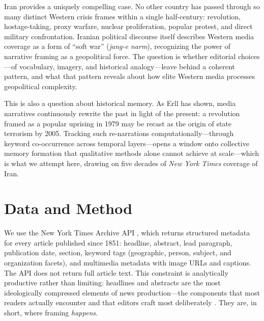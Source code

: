 \documentclass{dhnbpub}
\begin{document}
Iran provides a uniquely compelling case. No other country has passed through so many distinct Western crisis frames within a single half-century: revolution, hostage-taking, proxy warfare, nuclear proliferation, popular protest, and direct military confrontation. Iranian political discourse itself describes Western media coverage as a form of ``soft war'' (\emph{jang-e narm}), recognizing the power of narrative framing as a geopolitical force. The question is whether editorial choices---of vocabulary, imagery, and historical analogy---leave behind a coherent pattern, and what that pattern reveals about how elite Western media processes geopolitical complexity.


This is also a question about historical memory. As Erll \citep{Erll2011} has shown, media narratives continuously rewrite the past in light of the present: a revolution framed as a popular uprising in 1979 may be recast as the origin of state terrorism by 2005. Tracking such re-narrations computationally---through keyword co-occurrence across temporal layers---opens a window onto collective memory formation that qualitative methods alone cannot achieve at scale---which is what we attempt here, drawing on five decades of \textit{New York Times} coverage of Iran.

\section{Data and Method}

We use the New York Times Archive API \citep{NYTAPI}, which returns structured metadata for every article published since 1851: headline, abstract, lead paragraph, publication date, section, keyword tags (geographic, person, subject, and organization facets), and multimedia metadata with image URLs and captions. The API does not return full article text. This constraint is analytically productive rather than limiting: headlines and abstracts are the most ideologically compressed elements of news production---the components that most readers actually encounter and that editors craft most deliberately \citep{Entman1993}. They are, in short, where framing \emph{happens}.
\end{document}
